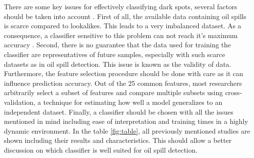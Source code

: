 There are some key issues for effectively classifying dark spots, several factors should be taken into account \cite{Kubat:1998:MLD:288808.288812}. First of all, the available data containing oil spills is scarce compared to lookalikes. This leads to a very imbalanced dataset. As a consequence, a classifier sensitive to this problem can not reach it's maximum accuracy \cite{Japkowicz20026}. Second, there is no guarantee that the data used for training the classifier are representatives of future samples, especially with such scarce datasets as in oil spill detection. This issue is known as the validity of data. Furthermore, the feature selection procedure should be done with care as it can influence prediction accuracy. Out of the 25 common features, most researchers arbitrarily select a subset of features and compare multiple subsets using cross-validation, a technique for estimating how well a model generalizes to an independent dataset. Finally, a classifier should be chosen with all the issues mentioned in mind including ease of interpretation and training times in a highly dynamic environment. In the table \ref{fig:table}, all previously mentioned studies are shown including their results and characteristics. This should allow a better discussion on which classifier is well suited for oil spill detection.\\

